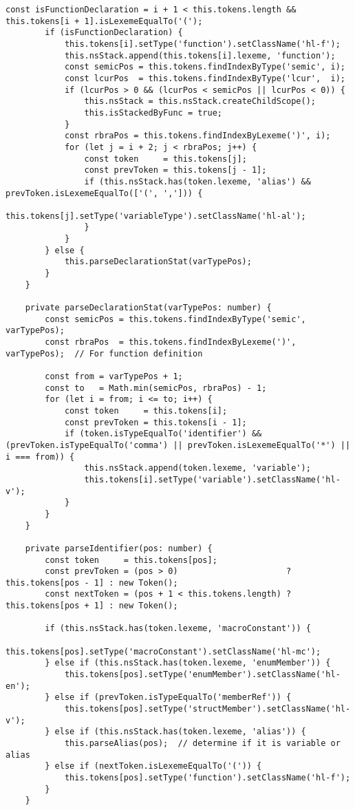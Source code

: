 \documentclass[autodetect-engine,dvi=dvipdfmx,ja=standard,
               a4j,11pt]{bxjsarticle}
\begin{document}
\begin{lstlisting}[caption={Cハイライタ({\tt c.ts})}, label={prog:c}]
        const isFunctionDeclaration = i + 1 < this.tokens.length && this.tokens[i + 1].isLexemeEqualTo('(');
        if (isFunctionDeclaration) {
            this.tokens[i].setType('function').setClassName('hl-f');
            this.nsStack.append(this.tokens[i].lexeme, 'function');
            const semicPos = this.tokens.findIndexByType('semic', i);
            const lcurPos  = this.tokens.findIndexByType('lcur',  i);
            if (lcurPos > 0 && (lcurPos < semicPos || lcurPos < 0)) {
                this.nsStack = this.nsStack.createChildScope();
                this.isStackedByFunc = true;
            }
            const rbraPos = this.tokens.findIndexByLexeme(')', i);
            for (let j = i + 2; j < rbraPos; j++) {
                const token     = this.tokens[j];
                const prevToken = this.tokens[j - 1];
                if (this.nsStack.has(token.lexeme, 'alias') && prevToken.isLexemeEqualTo(['(', ','])) {
                    this.tokens[j].setType('variableType').setClassName('hl-al');
                }
            }
        } else {
            this.parseDeclarationStat(varTypePos);
        }
    }

    private parseDeclarationStat(varTypePos: number) {
        const semicPos = this.tokens.findIndexByType('semic', varTypePos);
        const rbraPos  = this.tokens.findIndexByLexeme(')', varTypePos);  // For function definition

        const from = varTypePos + 1;
        const to   = Math.min(semicPos, rbraPos) - 1;
        for (let i = from; i <= to; i++) {
            const token     = this.tokens[i];
            const prevToken = this.tokens[i - 1];
            if (token.isTypeEqualTo('identifier') && (prevToken.isTypeEqualTo('comma') || prevToken.isLexemeEqualTo('*') || i === from)) {
                this.nsStack.append(token.lexeme, 'variable');
                this.tokens[i].setType('variable').setClassName('hl-v');
            }
        }
    }

    private parseIdentifier(pos: number) {
        const token     = this.tokens[pos];
        const prevToken = (pos > 0)                      ? this.tokens[pos - 1] : new Token();
        const nextToken = (pos + 1 < this.tokens.length) ? this.tokens[pos + 1] : new Token();

        if (this.nsStack.has(token.lexeme, 'macroConstant')) {
            this.tokens[pos].setType('macroConstant').setClassName('hl-mc');
        } else if (this.nsStack.has(token.lexeme, 'enumMember')) {
            this.tokens[pos].setType('enumMember').setClassName('hl-en');
        } else if (prevToken.isTypeEqualTo('memberRef')) {
            this.tokens[pos].setType('structMember').setClassName('hl-v');
        } else if (this.nsStack.has(token.lexeme, 'alias')) {
            this.parseAlias(pos);  // determine if it is variable or alias
        } else if (nextToken.isLexemeEqualTo('(')) {
            this.tokens[pos].setType('function').setClassName('hl-f');
        }
    }


\end{lstlisting}
\end{document}

